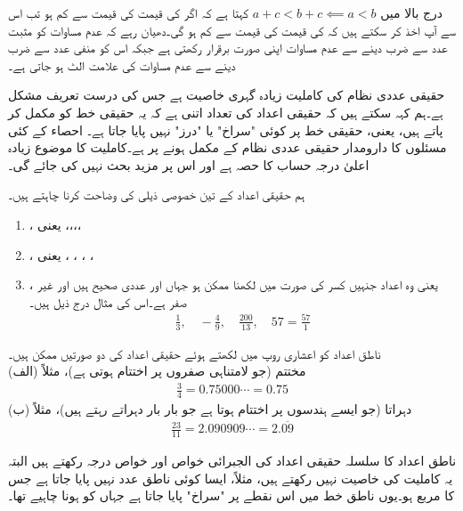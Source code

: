 درج بالا میں $a+c<b+c\impliedby a<b$ کہتا ہے کہ اگر  کی قیمت  کی قیمت سے کم ہو تب اس سے آپ اخذ کر سکتے ہیں کہ  کی قیمت  کی قیمت سے کم ہو گی۔دھیان رہے کہ عدم مساوات کو مثبت عدد سے ضرب دینے سے عدم مساوات اپنی صورت برقرار رکھتی ہے جبکہ اس کو منفی عدد سے ضرب دینے سے عدم مساوات کی علامت الٹ ہو جاتی ہے۔ 

حقیقی عددی نظام کی کاملیت زیادہ گہری خاصیت ہے جس کی درست تعریف مشکل ہے۔ہم کہہ سکتے ہیں کہ حقیقی اعداد کی تعداد اتنی ہے کہ یہ حقیقی خط کو مکمل کر پاتے ہیں، یعنی، حقیقی خط پر کوئی "سراخ" یا "درز" نہیں پایا جاتا ہے۔ احصاء کے کئی مسئلوں کا دارومدار حقیقی عددی نظام کے مکمل ہونے پر ہے۔کاملیت کا موضوع زیادہ اعلیٰ درجہ حساب کا حصہ ہے اور اس پر مزید بحث نہیں کی جائے گی۔  

ہم حقیقی اعداد کے تین خصوصی ذیلی  کی وضاحت کرنا چاہتے ہیں۔
\begin{enumerate}[1.]
\item
{}، یعنی ،،،،
\item
{}، یعنی ، ، ، ،
\item
{}، یعنی وہ اعداد جنہیں کسر  کی صورت میں لکھنا ممکن ہو جہاں  اور  عددی صحیح ہیں اور  غیر صفر  ہے۔اس کی مثال درج ذیل ہیں۔
\begin{align*}
\frac{1}{3},\quad -\frac{4}{9},\quad \frac{200}{13}, \quad 57=\frac{57}{1}
\end{align*} 
\end{enumerate}
ناطق اعداد کو اعشاری روپ میں لکھتے ہوئے حقیقی اعداد کی دو صورتیں ممکن ہیں۔\\
(الف) \quad
مختتم (جو لامتناہی صفروں پر اختتام ہوتی ہے)، مثلاً
\begin{align*}
\frac{3}{4}=0.75000\cdots=0.75
\end{align*}
(ب)\quad
دہراتا (جو ایسے ہندسوں پر اختتام ہوتا ہے جو بار بار دہراتے رہتے ہیں)، مثلاً
\begin{align*}
\frac{23}{11}=2.090909\cdots=2.\overline{09}
\end{align*}

ناطق اعداد  کا سلسلہ حقیقی اعداد کی  الجبرائی خواص اور خواص درجہ رکھتے ہیں البتہ یہ کاملیت کی خاصیت نہیں رکھتے ہیں، مثلاً، ایسا کوئی ناطق عدد نہیں پایا جاتا ہے جس کا مربع  ہو۔یوں ناطق خط میں اس نقطے پر "سراخ" پایا جاتا ہے جہاں  کو ہونا چاہیے تھا۔

